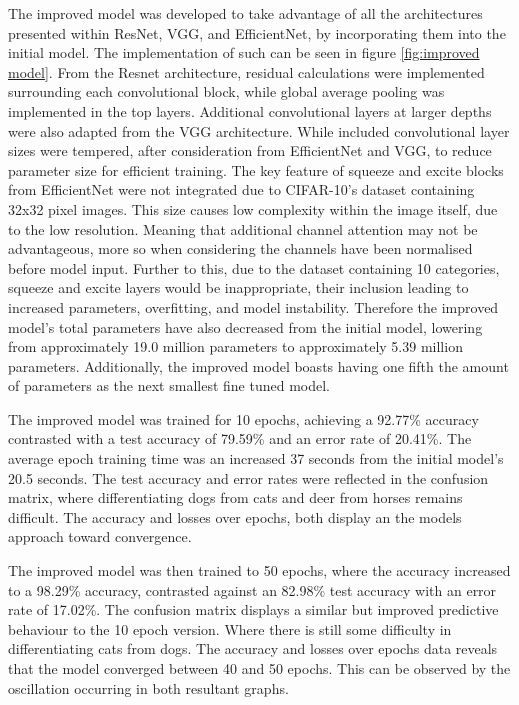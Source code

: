 \documentclass[10pt,twocolumn,letterpaper]{article}
\begin{document}
The improved model was developed to take advantage of all the architectures presented within ResNet, VGG, and EfficientNet, by incorporating them into the initial model. The implementation of such can be seen in figure \ref{fig:improved model}. From the Resnet architecture, residual calculations were implemented surrounding each convolutional block, while global average pooling was implemented in the top layers. Additional convolutional layers at larger depths were also adapted from the VGG architecture. While included convolutional layer sizes were tempered, after consideration from EfficientNet and VGG, to reduce parameter size for efficient training. The key feature of squeeze and excite blocks from EfficientNet were not integrated due to CIFAR-10's dataset containing 32x32 pixel images. This size causes low complexity within the image itself, due to the low resolution. Meaning that additional channel attention may not be advantageous, more so when considering the channels have been normalised before model input. Further to this, due to the dataset containing 10 categories, squeeze and excite layers would be inappropriate, their inclusion leading to increased parameters, overfitting, and model instability. Therefore the improved model's total parameters have also decreased from the initial model, lowering from approximately 19.0 million parameters to approximately 5.39 million parameters. Additionally, the improved model boasts having one fifth the amount of parameters as the next smallest fine tuned model. 

The improved model was trained for 10 epochs, achieving a 92.77\% accuracy contrasted with a test accuracy of 79.59\% and an error rate of 20.41\%. The average epoch training time was an increased 37 seconds from the initial model's 20.5 seconds. The test accuracy and error rates were reflected in the confusion matrix, where differentiating dogs from cats and deer from horses remains difficult. The accuracy and losses over epochs, both display an the models approach toward convergence.

The improved model was then trained to 50 epochs, where the accuracy increased to a  98.29\% accuracy, contrasted against an 82.98\% test accuracy with an error rate of 17.02\%. The confusion matrix displays a similar but improved predictive behaviour to the 10 epoch version. Where there is still some difficulty in differentiating cats from dogs. The accuracy and losses over epochs data reveals that the model converged between 40 and 50 epochs. This can be observed by the oscillation occurring in both resultant graphs.
\end{document}
